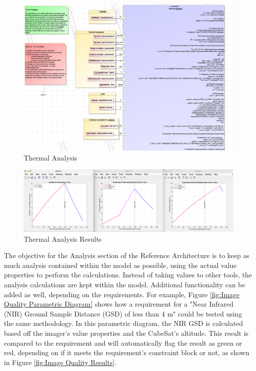 \documentclass[conference]{joss-pretty}
\begin{document}
\begin{figure}
    \centering
    \includegraphics[width=\textwidth]{Figures/Thermal Analysis.png}
    \caption{Thermal Analysis}
    \label{fig:Thermal Analysis}
\end{figure}

\begin{figure}
    \centering
    \includegraphics[width=\textwidth]{Figures/Thermal Graphs.png}
    \caption{Thermal Analysis Results}
    \label{fig:Thermal Analysis Results}
\end{figure}

The objective for the Analysis section of the Reference Architecture is to keep as much analysis contained within the model as possible, using the actual value properties to perform the calculations. Instead of taking values to other tools, the analysis calculations are kept within the model. Additional functionality can be added as well, depending on the requirements. For example, Figure \ref{fig:Image Quality Parametric Diagram} shows how a requirement for a "Near Infrared (NIR) Ground Sample Distance (GSD) of less than 4 m" could be tested using the same methodology. In this parametric diagram, the NIR GSD is calculated based off the imager's value properties and the CubeSat's altitude. This result is compared to the requirement and will automatically flag the result as green or red, depending on if it meets the requirement's constraint block or not, as shown in Figure \ref{fig:Image Quality Results}. 
\end{document}
